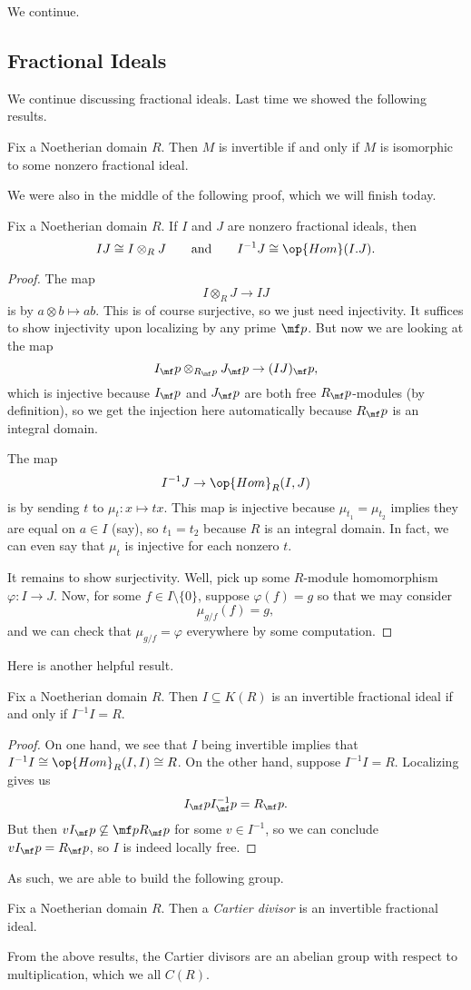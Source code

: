 
We continue.

\subsection{Fractional Ideals}
We continue discussing fractional ideals. Last time we showed the following results.
\begin{lemma} \label{lem:classifyinvertiblemods}
	Fix a Noetherian domain $R$. Then $M$ is invertible if and only if $M$ is isomorphic to some nonzero fractional ideal.
\end{lemma}
We were also in the middle of the following proof, which we will finish today.
\begin{lemma}
	Fix a Noetherian domain $R$. If $I$ and $J$ are nonzero fractional ideals, then
	\[IJ\cong I\otimes_RJ\qquad\text{and}\qquad I^{-1}J\cong\op{Hom}(I.J).\]
\end{lemma}
\begin{proof}
	The map
	\[I\otimes_RJ\to IJ\]
	is by $a\otimes b\mapsto ab$. This is of course surjective, so we just need injectivity. It suffices to show injectivity upon localizing by any prime $\mf p$. But now we are looking at the map
	\[I_\mf p\otimes_{R_\mf p}J_\mf p\to(IJ)_\mf p,\]
	which is injective because $I_\mf p$ and $J_\mf p$ are both free $R_\mf p$-modules (by definition), so we get the injection here automatically because $R_\mf p$ is an integral domain.

	The map
	\[I^{-1}J\to\op{Hom}_R(I,J)\]
	is by sending $t$ to $\mu_t:x\mapsto tx$. This map is injective because $\mu_{t_1}=\mu_{t_2}$ implies they are equal on $a\in I$ (say), so $t_1=t_2$ because $R$ is an integral domain. In fact, we can even say that $\mu_t$ is injective for each nonzero $t$.

	It remains to show surjectivity. Well, pick up some $R$-module homomorphism $\varphi:I\to J$. Now, for some $f\in I\setminus\{0\}$, suppose $\varphi(f)=g$ so that we may consider
	\[\mu_{g/f}(f)=g,\]
	and we can check that $\mu_{g/f}=\varphi$ everywhere by some computation.
\end{proof}
Here is another helpful result.
\begin{lemma}
	Fix a Noetherian domain $R$. Then $I\subseteq K(R)$ is an invertible fractional ideal if and only if $I^{-1}I=R$.
\end{lemma}
\begin{proof}
	On one hand, we see that $I$ being invertible implies that $I^{-1}I\cong\op{Hom}_R(I,I)\cong R$. On the other hand, suppose $I^{-1}I=R$. Localizing gives us
	\[I_\mf pI^{-1}_\mf p=R_\mf p.\]
	But then $vI_\mf p\not\subseteq\mf pR_\mf p$ for some $v\in I^{-1}$, so we can conclude $vI_\mf p=R_\mf p$, so $I$ is indeed locally free.
\end{proof}
As such, we are able to build the following group.
\begin{definition}
	Fix a Noetherian domain $R$. Then a \textit{Cartier divisor} is an invertible fractional ideal.
\end{definition}
From the above results, the Cartier divisors are an abelian group with respect to multiplication, which we all $C(R)$.

